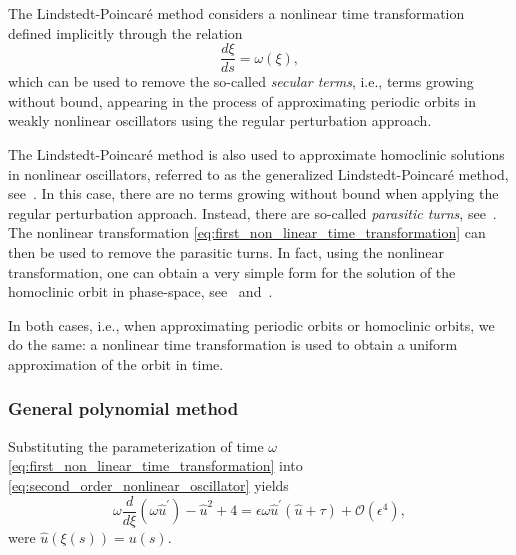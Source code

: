 The Lindstedt-Poincar\'e method considers a nonlinear time transformation
defined implicitly through the relation 
\begin{equation}
  \label{eq:first_non_linear_time_transformation}
  \frac{d\xi}{ds}=\omega(\xi),
\end{equation}
which can be used to remove the so-called \emph{secular terms}, i.e., terms
growing without bound, appearing in the process of approximating periodic
orbits in weakly nonlinear oscillators using the regular perturbation approach.

The Lindstedt-Poincar\'e method is also used to approximate homoclinic
solutions in nonlinear oscillators, referred to as the generalized
Lindstedt-Poincar\'e method,
see~\cite{Chen2009,Chen@2009A,Chen@2009B,Chen@2010,Chen@2012}. In this case,
there are no terms growing without bound when applying the regular perturbation
approach. Instead, there are so-called \emph{parasitic turns}, see~\cite[Figure
1]{Kuznetsov2014improved}.  The nonlinear transformation
\cref{eq:first_non_linear_time_transformation} can then be used to remove the
parasitic turns. In fact, using the nonlinear transformation, one can obtain a
very simple form for the solution of the homoclinic orbit in phase-space,
see~\cite[Equation 35]{Chen2009} and~\cite{Algaba_2019}.

In both cases, i.e., when approximating periodic orbits or homoclinic orbits,
we do the same: a nonlinear time transformation is used to obtain a uniform
approximation of the orbit in time. 

\subsubsection{General polynomial method}
\label{sec:PolynomailLindstedtPoincareMethod}
Substituting the parameterization of time $\omega$
\cref{eq:first_non_linear_time_transformation} into
\cref{eq:second_order_nonlinear_oscillator} yields
\begin{equation}
\label{eq:secondorder_gBT_omega}
\omega\dfrac{d}{d\xi}\left(\omega \hat u^\prime\right)-\hat u^2+4
  =\epsilon\omega \hat u^\prime (\hat u+\tau) + \mathcal O(\epsilon^4),
\end{equation}
were $\hat u(\xi(s)) = u(s)$.

